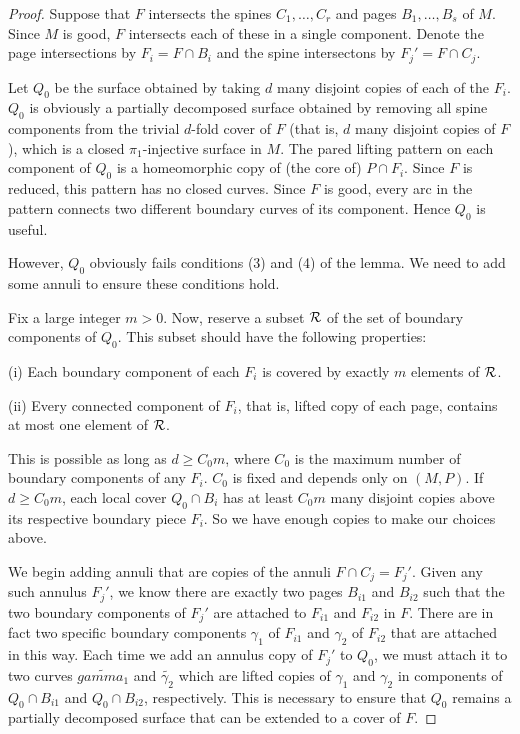 \begin{proof}

Suppose that $F$ intersects the spines $C_1,\dots,C_r$ and pages
$B_1,\dots,B_s$ of $M$.  Since $M$ is good, $F$ intersects each of these in
a single component.  Denote the page intersections by $F_i = F \cap B_i$ and
the spine intersectons by $F_j' = F \cap C_j$.

Let $Q_0$ be the surface obtained by taking $d$ many disjoint copies of each of
the $F_i$. $Q_0$ is obviously a partially decomposed surface obtained by
removing all spine components from the trivial $d$-fold cover of $F$ (that is,
$d$ many disjoint copies of $F$), which is a closed $\pi_1$-injective surface
in $M$.  The pared lifting pattern on each component of $Q_0$ is a homeomorphic
copy of (the core of) $P \cap F_i$. Since $F$ is reduced, this pattern has no
closed curves.  Since $F$ is good, every arc in the pattern connects two
different boundary curves of its component. Hence $Q_0$ is useful.

However, $Q_0$ obviously fails conditions (3) and (4) of the lemma. We need to
add some annuli to ensure these conditions hold.

Fix a large integer $m>0$. Now, reserve a subset $\mathcal{R}$ of the set of boundary
components of $Q_0$.  This subset should have the following properties:

(i) Each boundary component of each $F_i$ is covered by exactly $m$ elements of
$\mathcal{R}$.

(ii) Every connected component of $F_i$, that is, lifted copy of each page,
contains at most one element of $\mathcal{R}$.

This is possible as long as $d \geq C_0m$, where $C_0$ is the maximum number of
boundary components of any $F_i$. $C_0$ is fixed and depends only on $(M,P)$.
If $d\geq C_0m$,  each local cover $Q_0 \cap B_i$ has at least $C_0m$ many
disjoint copies above its respective boundary piece $F_i$.  So we have enough
copies to make our choices above.

We begin adding annuli that are copies of the annuli $F \cap C_j = F_j'$. Given
any such annulus $F_j'$, we know there are exactly two pages $B_{i1}$ and
$B_{i2}$ such that the two boundary components of $F_j'$ are attached to
$F_{i1}$ and $F_{i2}$ in $F$.  There are in fact two specific boundary
components $\gamma_1$ of $F_{i1}$ and $\gamma_2$ of $F_{i2}$ that are attached
in this way.  Each time we add an annulus copy of $F_j'$ to $Q_0$, we must
attach it to two curves $\widetilde{gamma_1}$ and $\widetilde{\gamma_2}$ which
are lifted copies of $\gamma_1$ and $\gamma_2$ in components of $Q_0 \cap
B_{i1}$ and $Q_0 \cap B_{i2}$, respectively.  This is necessary to ensure that
$Q_0$ remains a partially decomposed surface that can be extended to a cover of
$F$.


\end{proof}
